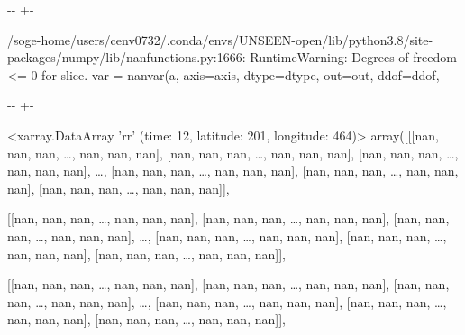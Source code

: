 \documentclass[letterpaper,10pt,english]{sphinxmanual}
\newlength\nbsphinxcodecellspacing
\begin{document}
{

\kern-\sphinxverbatimsmallskipamount\kern-\baselineskip
\kern+\FrameHeightAdjust\kern-\fboxrule
\vspace{\nbsphinxcodecellspacing}

\begin{sphinxVerbatim}[commandchars=\\\{\}]
/soge-home/users/cenv0732/.conda/envs/UNSEEN-open/lib/python3.8/site-packages/numpy/lib/nanfunctions.py:1666: RuntimeWarning: Degrees of freedom <= 0 for slice.
  var = nanvar(a, axis=axis, dtype=dtype, out=out, ddof=ddof,
\end{sphinxVerbatim}
}

{

\kern-\sphinxverbatimsmallskipamount\kern-\baselineskip
\kern+\FrameHeightAdjust\kern-\fboxrule
\vspace{\nbsphinxcodecellspacing}

\begin{sphinxVerbatim}[commandchars=\\\{\}]
\llap{\color{nbsphinxout}[46]:\,\hspace{\fboxrule}\hspace{\fboxsep}}<xarray.DataArray 'rr' (time: 12, latitude: 201, longitude: 464)>
array([[[nan, nan, nan, {\ldots}, nan, nan, nan],
        [nan, nan, nan, {\ldots}, nan, nan, nan],
        [nan, nan, nan, {\ldots}, nan, nan, nan],
        {\ldots},
        [nan, nan, nan, {\ldots}, nan, nan, nan],
        [nan, nan, nan, {\ldots}, nan, nan, nan],
        [nan, nan, nan, {\ldots}, nan, nan, nan]],

       [[nan, nan, nan, {\ldots}, nan, nan, nan],
        [nan, nan, nan, {\ldots}, nan, nan, nan],
        [nan, nan, nan, {\ldots}, nan, nan, nan],
        {\ldots},
        [nan, nan, nan, {\ldots}, nan, nan, nan],
        [nan, nan, nan, {\ldots}, nan, nan, nan],
        [nan, nan, nan, {\ldots}, nan, nan, nan]],

       [[nan, nan, nan, {\ldots}, nan, nan, nan],
        [nan, nan, nan, {\ldots}, nan, nan, nan],
        [nan, nan, nan, {\ldots}, nan, nan, nan],
        {\ldots},
        [nan, nan, nan, {\ldots}, nan, nan, nan],
        [nan, nan, nan, {\ldots}, nan, nan, nan],
        [nan, nan, nan, {\ldots}, nan, nan, nan]],


\end{sphinxVerbatim}}
\end{document}
